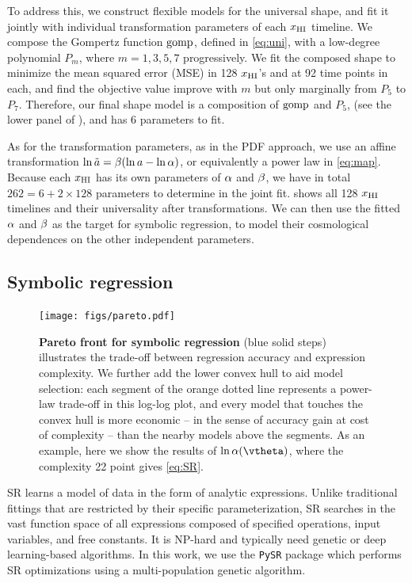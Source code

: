To address this, we construct flexible models for the universal shape,
and fit it jointly with individual transformation parameters of each
$x_{\mathrm{HI}}$ timeline.
We compose the Gompertz function $\mathrm{gomp}$, defined in \cref{eq:uni}, with
a low-degree polynomial $P_m$, where $m = 1, 3, 5, 7$ progressively.
We fit the composed shape to minimize the mean squared error (MSE) in
128 $x_{\mathrm{HI}}$'s and at 92 time points in each, and find the objective
value improve with $m$ but only marginally from $P_5$ to $P_7$.
Therefore, our final shape model is a composition of $\mathrm{gomp}$ and $P_5$,
(see the lower panel of ), and has 6 parameters to fit.

As for the transformation parameters, as in the PDF approach, we use an
affine transformation $\ln\tilde{a} = \beta (\ln a - \ln\alpha)$, or equivalently
a power law in \cref{eq:map}.
Because each $x_{\mathrm{HI}}$ has its own parameters of $\alpha$ and $\beta$, we
have in total $262 = 6 + 2 \times 128$ parameters to determine in the
joint fit.
 shows all 128 $x_{\mathrm{HI}}$ timelines and their universality
after transformations.
We can then use the fitted $\alpha$ and $\beta$ as the target for symbolic
regression, to model their cosmological dependences on the other
independent parameters.


\subsection*{Symbolic regression}
\label{ssec:pysr}

\begin{figure}[tb]
\centering
\texttt{[image: figs/pareto.pdf]}
\caption{\textbf{Pareto front for symbolic regression} (blue solid
steps) illustrates the trade-off between regression accuracy and
expression complexity.
We further add the lower convex hull to aid model selection: each
segment of the orange dotted line represents a power-law trade-off in
this log-log plot, and every model that touches the convex hull is more
economic -- in the sense of accuracy gain at cost of complexity -- than
the nearby models above the segments.
As an example, here we show the results of $\ln\ap(\vtheta)$, where the
complexity 22 point gives \cref{eq:SR}.}
\label{fig:pareto}
\end{figure}

SR learns a model of data in the form of analytic expressions.
Unlike traditional fittings that are restricted by their specific
parameterization, SR searches in the vast function space of all
expressions composed of specified operations, input variables, and free
constants.
It is NP-hard \cite{SongEtAl2024, VirgolinPissis2022} and typically need
genetic or deep learning-based algorithms.
In this work, we use the \texttt{PySR} package \cite{Cranmer2020b,
Cranmer2023} which performs SR optimizations using a multi-population
genetic algorithm.


